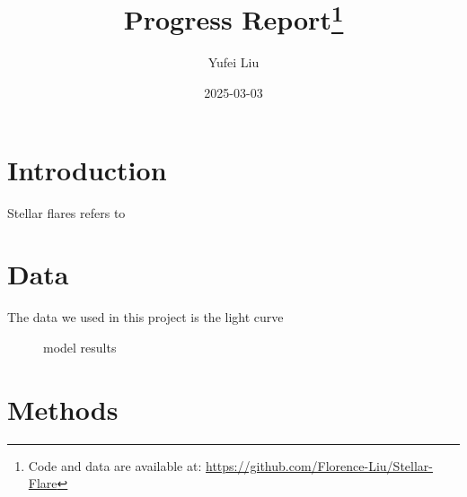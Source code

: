 \documentclass[
]{article}
\title{Progress Report\thanks{Code and data are available at: \url{https://github.com/Florence-Liu/Stellar-Flare}}}
\author{Yufei Liu}
\date{2025-03-03}
\begin{document}
\maketitle

\section{Introduction}\label{introduction}

Stellar flares refers to

\section{Data}\label{data}

The data we used in this project is the light curve

\begin{figure}[H]

{\centering {}

}

\caption{model results}\label{fig:data}
\end{figure}

\section{Methods}\label{methods}
\end{document}
